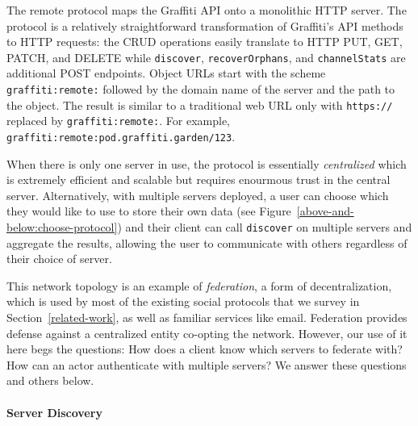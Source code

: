 The remote protocol maps the Graffiti API onto
a monolithic HTTP server.
The protocol is a relatively straightforward transformation of
Graffiti's API methods to HTTP requests: the CRUD operations
easily translate to HTTP PUT, GET, PATCH, and DELETE while
\texttt{discover}, \texttt{recoverOrphans}, and \texttt{channelStats}
are additional POST endpoints.
Object URLs start with the scheme \texttt{graffiti:remote:}
followed by the domain name of the server and the
path to the object. The result is similar to a traditional
web URL only with \texttt{https://} replaced by \texttt{graffiti:remote:}.
For example, \texttt{graffiti:remote:pod.graffiti.garden/123}.

When there is only one server in use, the protocol is essentially
\emph{centralized} which is extremely efficient and scalable but requires
enourmous trust in the central server.
Alternatively, with multiple servers deployed,
a user can choose which they would like to use to store their own data
(see Figure~\ref{above-and-below:choose-protocol})
and their client can call \texttt{discover} on
multiple servers and aggregate the results,
allowing the user to communicate with others regardless
of their choice of server.

This network topology is an example of \emph{federation},
a form of decentralization, which is used by most of the
existing social protocols that we survey in Section~\ref{related-work},
as well as familiar services like email.
Federation provides defense against a centralized entity
co-opting the network.
However, our use of it here begs the questions:
How does a client know which servers to federate with?
How can an actor authenticate with multiple servers?
We answer these questions and others below.


\paragraph{Server Discovery}

